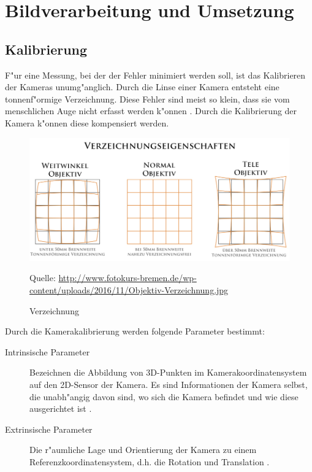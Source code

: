 \chapter{Bildverarbeitung und Umsetzung}
\label{cha:verarbeitungumsetzung}

\section{Kalibrierung}
\label{sec:kalibrierung}

F"ur eine Messung, bei der der Fehler minimiert werden soll, ist das Kalibrieren der Kameras unumg"anglich. Durch die Linse einer Kamera entsteht eine tonnenf"ormige Verzeichnung. Diese Fehler sind meist so klein, dass sie vom menschlichen Auge nicht erfasst werden k"onnen \cite{VZ} \cite{VZ1}. Durch die Kalibrierung der Kamera k"onnen diese kompensiert werden.\newline

\begin{figure}[H]
	\includegraphics[scale=0.45]{bilder/verzeichnung}
	\caption[Verzeichnung]{Verzeichnung}
	\small Quelle: \url{http://www.fotokurs-bremen.de/wp-content/uploads/2016/11/Objektiv-Verzeichnung.jpg}
\end{figure}

\noindent Durch die Kamerakalibrierung werden folgende Parameter bestimmt:

\begin{description}
	\item[Intrinsische Parameter]
	Bezeichnen die Abbildung von 3D-Punkten im Kamerakoordinatensystem auf den 2D-Sensor der Kamera. Es sind Informationen der Kamera selbst, die unabh"angig davon sind, wo sich die Kamera befindet und wie diese ausgerichtet ist \cite{Intr}.
	
	\item[Extrinsische Parameter]
	Die r"aumliche Lage und Orientierung der Kamera zu einem Referenzkoordinatensystem, d.h. die Rotation und Translation \cite{cal} \cite{extr}.
\end{description}

